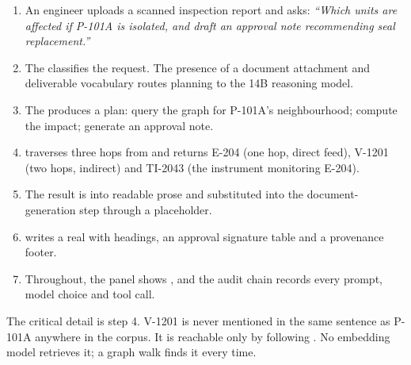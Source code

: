 \begin{enumerate}
\item An engineer uploads a scanned inspection report and asks: \emph{``Which
      units are affected if P-101A is isolated, and draft an approval note
      recommending seal replacement.''}
\item The  classifies the request. The presence of a document
      attachment and deliverable vocabulary routes planning to the 14B
      reasoning model.
\item The  produces a plan: query the graph for P-101A's
      neighbourhood; compute the impact; generate an approval note.
\item {} traverses three hops from  and
      returns E-204 (one hop, direct feed), V-1201 (two hops, indirect) and
      TI-2043 (the instrument monitoring E-204).
\item The result is  into readable prose and substituted into
      the document-generation step through a  placeholder.
\item {} writes a real  with headings, an
      approval signature table and a provenance footer.
\item Throughout, the  panel shows
      , and the audit chain records every prompt,
      model choice and tool call.
\end{enumerate}

The critical detail is step 4. V-1201 is never mentioned in the same sentence
as P-101A anywhere in the corpus. It is reachable only by following
. No embedding model retrieves
it; a graph walk finds it every time.
